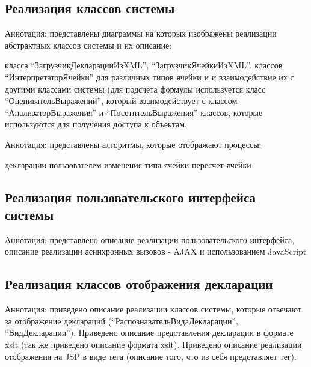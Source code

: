 \documentclass[14pt,a4paper]{reportmod}
\begin{document}
\subsection{Реализация классов системы}
Аннотация: представлены диаграммы на которых изображены реализации абстрактных классов системы и их описание:
\begin{itemize}
   класса ``ЗагрузчикДекларацииИзXML'', ``ЗагрузчикЯчейкиИзXML''.
   классов ``ИнтерпретаторЯчейки'' для различных типов ячейки и и взаимодействие их с другими классами системы (для подсчета формулы используется класс ``ОценивательВыражений'', который взаимодействует с классом ``АнализаторВыражения'' и ``ПосетительВыражения''
   классов, которые используются для получения доступа к объектам.
\end{itemize}

Аннотация: представлены алгоритмы, которые отображают процессы:
\begin{itemize}
   декларации пользователем
   изменения типа ячейки
   пересчет ячейки
\end{itemize}
\subsection{Реализация пользовательского интерфейса системы}
Аннотация: представлено описание реализации пользовательского интерфейса, описание реализации асинхронных вызовов - AJAX и использованием JavaScript

\subsection{Реализация классов отображения декларации}
Аннотация: приведено описание реализации классов системы, которые отвечают за отображение деклараций (``РаспознавательВидаДекларации'', ``ВидДекларации''). Приведено описание представления декларации в формате xslt (так же приведено описание формата xslt). Приведено описание реализации отображения на JSP в виде тега (описание того, что из себя представляет тег).
\end{document}
